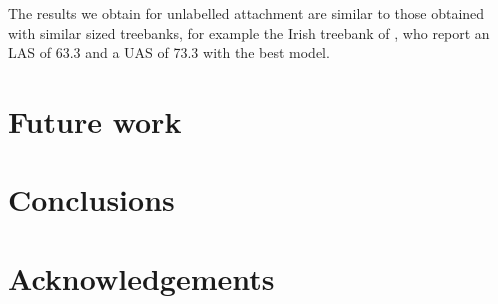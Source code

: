 \documentclass[a4paper,11pt, onecolumn,twoside]{article}
\begin{document}
The results we obtain for unlabelled attachment are similar to those obtained with similar 
sized treebanks, for example the Irish treebank of \cite{Lynn12}, who report an LAS of
63.3 and a UAS of 73.3 with the best model.


\section{Future work}




\section{Conclusions}

\section*{Acknowledgements}




\end{document}
